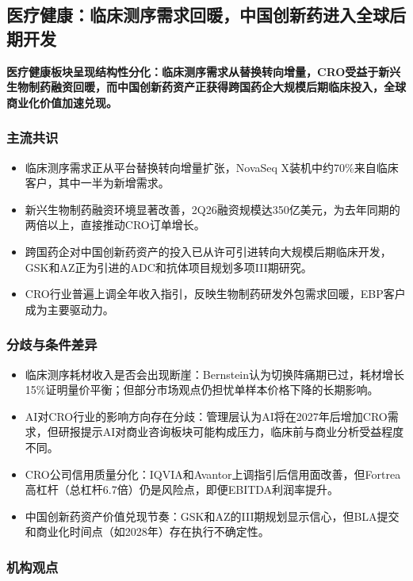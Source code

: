 \documentclass[11pt]{ctexart}
\begin{document}
\subsection{医疗健康：临床测序需求回暖，中国创新药进入全球后期开发}
\textbf{医疗健康板块呈现结构性分化：临床测序需求从替换转向增量，CRO受益于新兴生物制药融资回暖，而中国创新药资产正获得跨国药企大规模后期临床投入，全球商业化价值加速兑现。}
\subsubsection*{主流共识}
\begin{itemize}
  \item 临床测序需求正从平台替换转向增量扩张，NovaSeq X装机中约70\%来自临床客户，其中一半为新增需求。
  \item 新兴生物制药融资环境显著改善，2Q26融资规模达350亿美元，为去年同期的两倍以上，直接推动CRO订单增长。
  \item 跨国药企对中国创新药资产的投入已从许可引进转向大规模后期临床开发，GSK和AZ正为引进的ADC和抗体项目规划多项III期研究。
  \item CRO行业普遍上调全年收入指引，反映生物制药研发外包需求回暖，EBP客户成为主要驱动力。
\end{itemize}
\subsubsection*{分歧与条件差异}
\begin{itemize}
  \item 临床测序耗材收入是否会出现断崖：Bernstein认为切换阵痛期已过，耗材增长15\%证明量价平衡；但部分市场观点仍担忧单样本价格下降的长期影响。
  \item AI对CRO行业的影响方向存在分歧：管理层认为AI将在2027年后增加CRO需求，但研报提示AI对商业咨询板块可能构成压力，临床前与商业分析受益程度不同。
  \item CRO公司信用质量分化：IQVIA和Avantor上调指引后信用面改善，但Fortrea高杠杆（总杠杆6.7倍）仍是风险点，即便EBITDA利润率提升。
  \item 中国创新药资产价值兑现节奏：GSK和AZ的III期规划显示信心，但BLA提交和商业化时间点（如2028年）存在执行不确定性。
\end{itemize}
\subsubsection*{机构观点}
\end{document}
